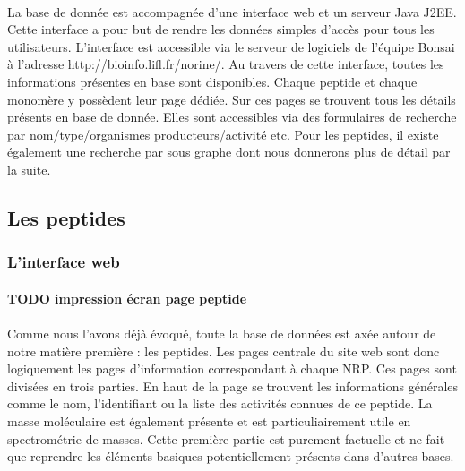 \documentclass[12pt,french,twoside]{report}
\begin{document}
\paragraph{}La base de donnée est accompagnée d'une interface web et un serveur Java J2EE.
Cette interface a pour but de rendre les données simples d'accès pour tous les utilisateurs.
L'interface est accessible via le serveur de logiciels de l'équipe Bonsai à l'adresse http://bioinfo.lifl.fr/norine/.
Au travers de cette interface, toutes les informations présentes en base sont disponibles.
Chaque peptide et chaque monomère y possèdent leur page dédiée.
Sur ces pages se trouvent tous les détails présents en base de donnée.
Elles sont accessibles via des formulaires de recherche par nom/type/organismes producteurs/activité etc.
Pour les peptides, il existe également une recherche par sous graphe dont nous donnerons plus de détail par la suite.



\subsection{Les peptides}

\subsubsection{L'interface web}

\paragraph{TODO impression écran page peptide}

\paragraph{}Comme nous l'avons déjà évoqué, toute la base de données est axée autour de notre matière première : les peptides.
Les pages centrale du site web sont donc logiquement les pages d'information correspondant à chaque NRP.
Ces pages sont divisées en trois parties.
En haut de la page se trouvent les informations générales comme le nom, l'identifiant ou la liste des activités connues de ce peptide.
La masse moléculaire est également présente et est particuliairement utile en spectrométrie de masses.
Cette première partie est purement factuelle et ne fait que reprendre les éléments basiques potentiellement présents dans d'autres bases.
\end{document}
